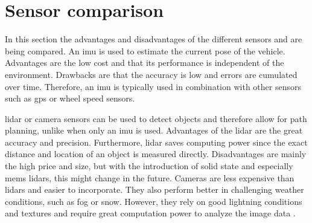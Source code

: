 \section{Sensor comparison}
\label{sec:methods_sensors_comparison}
In this section the advantages and disadvantages of the different sensors and are being compared.
An \gls{imu} is used to estimate the current pose of the vehicle.
Advantages are the low cost and that its performance is independent of the environment.
Drawbacks are that the accuracy is low and errors are cumulated over time.
Therefore, an \gls{imu} is typically used in combination with other sensors such as \gls{gps} or wheel speed sensors.

\gls{lidar} or camera sensors can be used to detect objects and therefore allow for path planning, unlike when only an \gls{imu} is used.
Advantages of the \gls{lidar} are the great accuracy and precision.
Furthermore, \gls{lidar} saves computing power since the exact distance and location of an object is measured directly.
Disadvantages are mainly the high price and size, but with the introduction of solid state and especially \gls{mems} \glspl{lidar}, this might change in the future.
Cameras are less expensive than \glspl{lidar} and easier to incorporate.
They also perform better in challenging weather conditions, such as fog or snow.
However, they rely on good lightning conditions and textures and require great computation power to analyze the image data \cite{Liu2021}.
